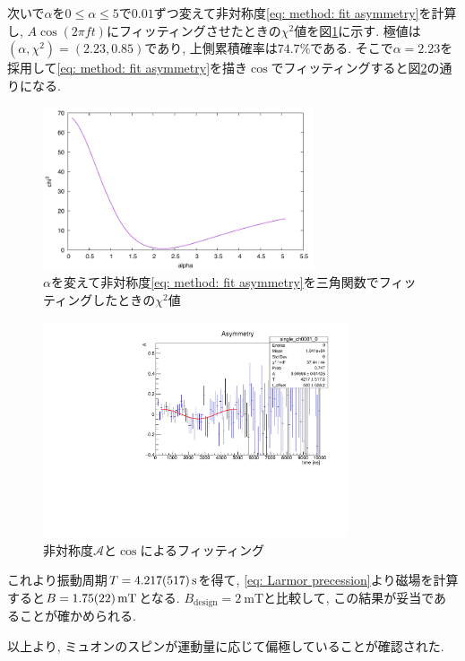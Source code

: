 \documentclass[dvipdfmx]{jsarticle}
\begin{document}
次いで$\alpha$を$0\leq\alpha\leq5$で$0.01$ずつ変えて非対称度\eqref{eq: method: fit asymmetry}を計算し, $A\cos(2\pi ft)$にフィッティングさせたときの$\chi^2$値を図\ref{fig: result: alpha and chi square}に示す.
極値は$(\alpha,\chi^2)=(2.23, 0.85)$であり, 上側累積確率は$74.7\%$である.
そこで$\alpha=2.23$を採用して\eqref{eq: method: fit asymmetry}を描き$\cos$でフィッティングすると図\ref{fig: result: asymmetry}の通りになる.

\begin{figure}
    \centering
    \includegraphics[width=8cm]{../img/results/alpha-chi2.pdf}
    \caption{$\alpha$を変えて非対称度\eqref{eq: method: fit asymmetry}を三角関数でフィッティングしたときの$\chi^2$値}
    \label{fig: result: alpha and chi square}
\end{figure}

\begin{figure}
    \centering
    \includegraphics[width=9cm]{../img/results/asymmetry.pdf}
    \caption{非対称度$\mathscr{A}$と$\cos$によるフィッティング}
    \label{fig: result: asymmetry}
\end{figure}

これより振動周期$T=\SI{4.217\pm0.517}{\second}$を得て, \eqref{eq: Larmor precession}より磁場を計算すると$B=\SI{1.75+-0.22}{\milli\tesla}$となる.
$B_{\text{design}}=\SI{2}{\milli\tesla}$と比較して, この結果が妥当であることが確かめられる.

以上より, ミュオンのスピンが運動量に応じて偏極していることが確認された.
\end{document}
